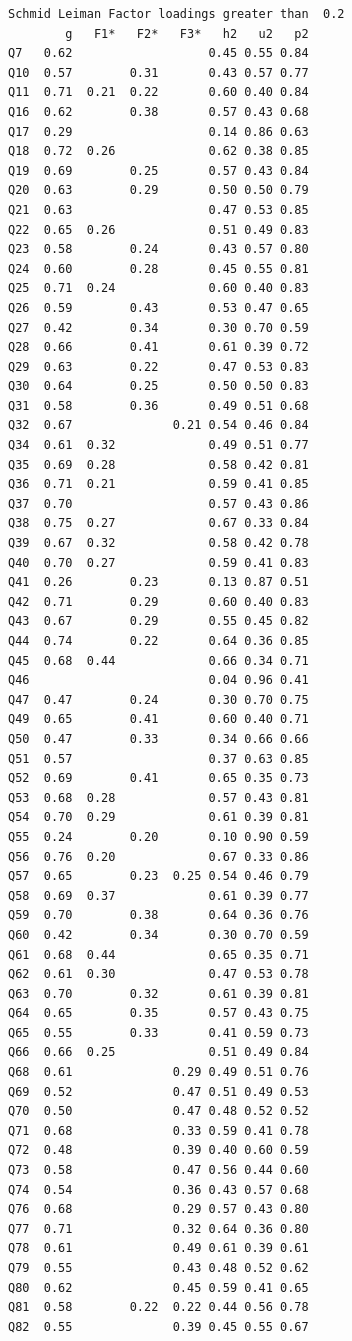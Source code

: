 \documentclass[
]{article}
\begin{document}
\begin{verbatim}
Schmid Leiman Factor loadings greater than  0.2 
        g   F1*   F2*   F3*   h2   u2   p2
Q7   0.62                   0.45 0.55 0.84
Q10  0.57        0.31       0.43 0.57 0.77
Q11  0.71  0.21  0.22       0.60 0.40 0.84
Q16  0.62        0.38       0.57 0.43 0.68
Q17  0.29                   0.14 0.86 0.63
Q18  0.72  0.26             0.62 0.38 0.85
Q19  0.69        0.25       0.57 0.43 0.84
Q20  0.63        0.29       0.50 0.50 0.79
Q21  0.63                   0.47 0.53 0.85
Q22  0.65  0.26             0.51 0.49 0.83
Q23  0.58        0.24       0.43 0.57 0.80
Q24  0.60        0.28       0.45 0.55 0.81
Q25  0.71  0.24             0.60 0.40 0.83
Q26  0.59        0.43       0.53 0.47 0.65
Q27  0.42        0.34       0.30 0.70 0.59
Q28  0.66        0.41       0.61 0.39 0.72
Q29  0.63        0.22       0.47 0.53 0.83
Q30  0.64        0.25       0.50 0.50 0.83
Q31  0.58        0.36       0.49 0.51 0.68
Q32  0.67              0.21 0.54 0.46 0.84
Q34  0.61  0.32             0.49 0.51 0.77
Q35  0.69  0.28             0.58 0.42 0.81
Q36  0.71  0.21             0.59 0.41 0.85
Q37  0.70                   0.57 0.43 0.86
Q38  0.75  0.27             0.67 0.33 0.84
Q39  0.67  0.32             0.58 0.42 0.78
Q40  0.70  0.27             0.59 0.41 0.83
Q41  0.26        0.23       0.13 0.87 0.51
Q42  0.71        0.29       0.60 0.40 0.83
Q43  0.67        0.29       0.55 0.45 0.82
Q44  0.74        0.22       0.64 0.36 0.85
Q45  0.68  0.44             0.66 0.34 0.71
Q46                         0.04 0.96 0.41
Q47  0.47        0.24       0.30 0.70 0.75
Q49  0.65        0.41       0.60 0.40 0.71
Q50  0.47        0.33       0.34 0.66 0.66
Q51  0.57                   0.37 0.63 0.85
Q52  0.69        0.41       0.65 0.35 0.73
Q53  0.68  0.28             0.57 0.43 0.81
Q54  0.70  0.29             0.61 0.39 0.81
Q55  0.24        0.20       0.10 0.90 0.59
Q56  0.76  0.20             0.67 0.33 0.86
Q57  0.65        0.23  0.25 0.54 0.46 0.79
Q58  0.69  0.37             0.61 0.39 0.77
Q59  0.70        0.38       0.64 0.36 0.76
Q60  0.42        0.34       0.30 0.70 0.59
Q61  0.68  0.44             0.65 0.35 0.71
Q62  0.61  0.30             0.47 0.53 0.78
Q63  0.70        0.32       0.61 0.39 0.81
Q64  0.65        0.35       0.57 0.43 0.75
Q65  0.55        0.33       0.41 0.59 0.73
Q66  0.66  0.25             0.51 0.49 0.84
Q68  0.61              0.29 0.49 0.51 0.76
Q69  0.52              0.47 0.51 0.49 0.53
Q70  0.50              0.47 0.48 0.52 0.52
Q71  0.68              0.33 0.59 0.41 0.78
Q72  0.48              0.39 0.40 0.60 0.59
Q73  0.58              0.47 0.56 0.44 0.60
Q74  0.54              0.36 0.43 0.57 0.68
Q76  0.68              0.29 0.57 0.43 0.80
Q77  0.71              0.32 0.64 0.36 0.80
Q78  0.61              0.49 0.61 0.39 0.61
Q79  0.55              0.43 0.48 0.52 0.62
Q80  0.62              0.45 0.59 0.41 0.65
Q81  0.58        0.22  0.22 0.44 0.56 0.78
Q82  0.55              0.39 0.45 0.55 0.67


\end{verbatim}
\end{document}
